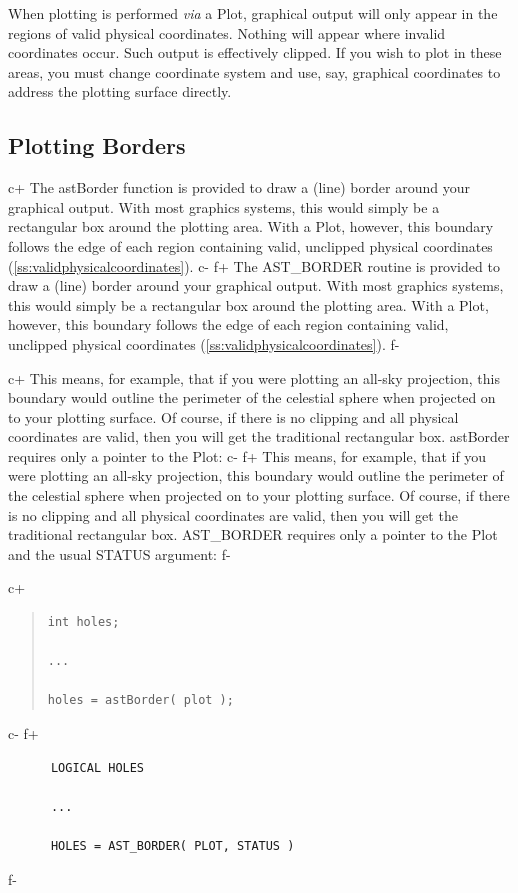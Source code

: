\documentclass[twoside,11pt]{article}
\newcommand{\secref}[1]{\S\ref{#1}}
\renewcommand{\secref}[1]{\ref{#1}}
\begin{document}
When plotting is performed {\em{via}} a Plot, graphical output will
only appear in the regions of valid physical coordinates. Nothing will
appear where invalid coordinates occur. Such output is effectively
clipped. If you wish to plot in these areas, you must change
coordinate system and use, say, graphical coordinates to address the
plotting surface directly.

\subsection{Plotting Borders}

c+
The astBorder function is provided to draw a (line) border around your
graphical output. With most graphics systems, this would simply be a
rectangular box around the plotting area. With a Plot, however, this
boundary follows the edge of each region containing valid, unclipped
physical coordinates (\secref{ss:validphysicalcoordinates}).
c-
f+
The AST\_BORDER routine is provided to draw a (line) border around
your graphical output. With most graphics systems, this would simply
be a rectangular box around the plotting area. With a Plot, however,
this boundary follows the edge of each region containing valid,
unclipped physical coordinates (\secref{ss:validphysicalcoordinates}).
f-

c+
This means, for example, that if you were plotting an all-sky
projection, this boundary would outline the perimeter of the celestial
sphere when projected on to your plotting surface. Of course, if there
is no clipping and all physical coordinates are valid, then you will
get the traditional rectangular box. astBorder requires only
a pointer to the Plot:
c-
f+
This means, for example, that if you were plotting an all-sky
projection, this boundary would outline the perimeter of the celestial
sphere when projected on to your plotting surface. Of course, if there
is no clipping and all physical coordinates are valid, then you will
get the traditional rectangular box. AST\_BORDER requires only a
pointer to the Plot and the usual STATUS argument:
f-

c+
\begin{quote}
\small
\begin{verbatim}
int holes;

...

holes = astBorder( plot );
\end{verbatim}
\normalsize
\end{quote}
c-
f+
\small
\begin{verbatim}
      LOGICAL HOLES

      ...

      HOLES = AST_BORDER( PLOT, STATUS )
\end{verbatim}
\normalsize
f-
\end{document}
